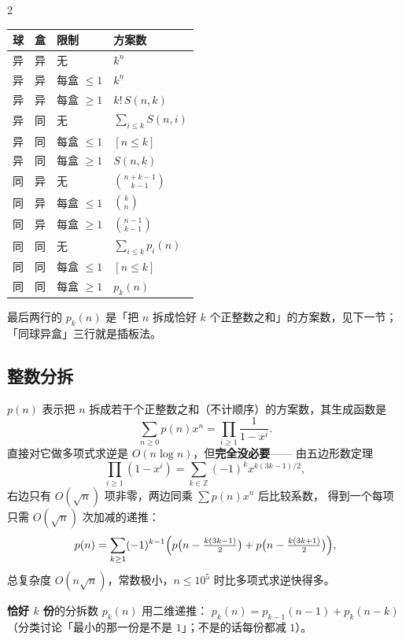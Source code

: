 \begin{multicols*}{2}
		\begin{center}
		\begin{tabular}{@{}llll@{}}
			\hline
			球 & 盒 & 限制 & 方案数 \\
			\hline
			异 & 异 & 无 & $k^n$ \\
			异 & 异 & 每盒 $\le 1$ & $k^{\underline{n}}$ \\
			异 & 异 & 每盒 $\ge 1$ & $k!\,S(n,k)$ \\
			异 & 同 & 无 & $\sum_{i\le k}S(n,i)$ \\
			异 & 同 & 每盒 $\le 1$ & $[n\le k]$ \\
			异 & 同 & 每盒 $\ge 1$ & $S(n,k)$ \\
			同 & 异 & 无 & $\binom{n+k-1}{k-1}$ \\
			同 & 异 & 每盒 $\le 1$ & $\binom{k}{n}$ \\
			同 & 异 & 每盒 $\ge 1$ & $\binom{n-1}{k-1}$ \\
			同 & 同 & 无 & $\sum_{i \le k} p_i(n)$ \\
			同 & 同 & 每盒 $\le 1$ & $[n\le k]$ \\
			同 & 同 & 每盒 $\ge 1$ & $p_k(n)$ \\
			\hline
		\end{tabular}
		\end{center}

		最后两行的 $p_k(n)$ 是「把 $n$ 拆成恰好 $k$ 个正整数之和」的方案数，见下一节；
		「同球异盒」三行就是插板法。

		\subsection{整数分拆}

		$p(n)$ 表示把 $n$ 拆成若干个正整数之和（不计顺序）的方案数，其生成函数是
		\[
			\sum_{n\ge0}p(n)x^n = \prod_{i\ge1}\frac{1}{1-x^i}.
		\]
		直接对它做多项式求逆是 $O(n\log n)$，但\textbf{完全没必要}——
		由五边形数定理
		\[
			\prod_{i\ge1}(1-x^i) = \sum_{k\in\mathbb{Z}}(-1)^k x^{k(3k-1)/2},
		\]
		右边只有 $O(\sqrt n)$ 项非零，两边同乘 $\sum p(n)x^n$ 后比较系数，
		得到一个每项只需 $O(\sqrt n)$ 次加减的递推：
		\[
			p(n) = \sum_{k \ge 1}(-1)^{k-1}\Bigl(p\bigl(n - \tfrac{k(3k-1)}{2}\bigr)
			     + p\bigl(n - \tfrac{k(3k+1)}{2}\bigr)\Bigr),
		\]
		总复杂度 $O(n\sqrt n)$，常数极小，$n \le 10^5$ 时比多项式求逆快得多。

		\textbf{恰好 $k$ 份}的分拆数 $p_k(n)$ 用二维递推：
		$p_k(n) = p_{k-1}(n-1) + p_k(n-k)$
		（分类讨论「最小的那一份是不是 $1$」；不是的话每份都减 $1$）。


\end{multicols*}
